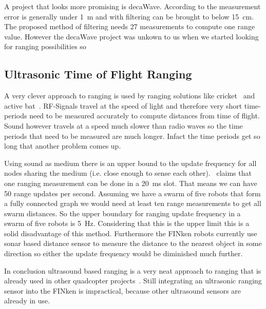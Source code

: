 A project that looks more promising is decaWave.
According to \cite{uwb_localisation_copter} the measurement error is generally under \SI{1}{\metre} and with filtering can be brought to below \SI{15}{\centi\metre}.
The proposed method of filtering needs 27 measurements to compute one range value.
However the decaWave project was unkown to us when we started looking for ranging possibilities so 

\subsection{Ultrasonic Time of Flight Ranging}
A very clever approach to ranging is used by ranging solutions like cricket~\cite{cricket_01} and active bat~\cite{active_bat}. 
RF-Signals travel at the speed of light and therefore very short time-periods need to be measured accurately to compute distances from time of flight.
Sound however travels at a speed much slower than radio waves so the time periods that need to be measured are much longer.
Infact the time periods get so long that another problem comes up.

Using sound as medium there is an upper bound to the update frequency for all nodes sharing the medium (i.e. close enough to sense each other).~\cite{active_bat} claims that one ranging measurement can be done in a \SI{20}{\milli\second} slot.
That means we can have 50 range updates per second. Assuming we have a swarm of five robots that form a fully connected graph we would need at least ten range measurements to get all swarm distances.
So the upper boundary for ranging update frequency in a swarm of five robots is \SI{5}{\hertz}.
Considering that this is the upper limit this is a solid disadvantage of this method.
Furthermore the FINken robots currently use sonar based distance sensor to measure the distance to the nearest object in some direction so either the update frequency would be diminished much further.

In conclusion ultrasound based ranging is a very neat approach to ranging that is already used in other quadcopter projects~\cite{ultrasonic_erlangen}.
Still integrating an ultrasonic ranging sensor into the FINken is impractical, because other ultrasound sensors are already in use.


